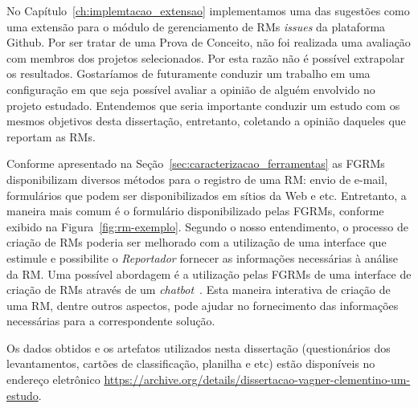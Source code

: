 No Capítulo~\ref{ch:implemtacao_extensao} implementamos uma das sugestões como
uma extensão para o módulo de gerenciamento de RMs \textit{issues} da
plataforma Github. Por ser tratar de uma Prova de Conceito, não foi realizada
uma avaliação com membros dos projetos selecionados. Por esta razão não é
possível extrapolar os resultados.  Gostaríamos de futuramente conduzir um
trabalho em uma configuração em que seja possível avaliar a opinião de alguém
envolvido no projeto estudado. Entendemos que seria importante conduzir um
estudo com os mesmos objetivos desta dissertação, entretanto, coletando a
opinião daqueles que reportam as RMs.

Conforme apresentado na Seção~\ref{sec:caracterizacao_ferramentas} as FGRMs
disponibilizam diversos métodos para o registro de uma RM\@: envio de e-mail,
formulários que podem ser disponibilizados em sítios da Web e etc. Entretanto,
a maneira mais comum é o formulário disponibilizado pelas FGRMs, conforme
exibido na Figura~\ref{fig:rm-exemplo}. Segundo o nosso entendimento, o
processo de criação de RMs poderia ser melhorado com a utilização de uma
interface que estimule e possibilite o \textit{Reportador} fornecer as
informações necessárias à análise da RM. Uma possível abordagem é a utilização
pelas FGRMs de uma interface de criação de RMs através de um
\textit{chatbot}~\cite{mauldin1994chatterbots,huang2007extracting}. Esta
maneira interativa de criação de uma RM, dentre outros aspectos, pode ajudar no
fornecimento das informações necessárias para a correspondente solução.

Os dados obtidos e os artefatos utilizados nesta dissertação (questionários dos
levantamentos, cartões de classificação, planilha e etc) estão disponíveis no
endereço eletrônico
\url{https://archive.org/details/dissertacao-vagner-clementino-um-estudo}.
